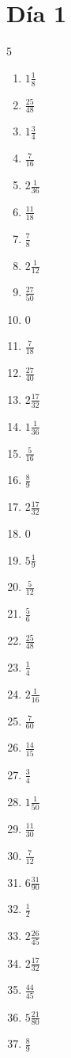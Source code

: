 \documentclass[12pt]{article}
\begin{document}
\section*{Día 1}
\begin{multicols}{5}\begin{enumerate}
\item $ 1 \frac{1}{8} $
\item $ \frac{25}{48} $
\item $ 1 \frac{3}{4} $
\item $ \frac{7}{16} $
\item $ 2 \frac{1}{36} $
\item $ \frac{11}{18} $
\item $ \frac{7}{8} $
\item $ 2 \frac{1}{12} $
\item $ \frac{27}{50} $
\item $ 0 $
\item $ \frac{7}{18} $
\item $ \frac{27}{40} $
\item $ 2 \frac{17}{32} $
\item $ 1 \frac{1}{36} $
\item $ \frac{5}{16} $
\item $ \frac{8}{9} $
\item $ 2 \frac{17}{32} $
\item $ 0 $
\item $ 5 \frac{1}{9} $
\item $ \frac{5}{12} $
\item $ \frac{5}{6} $
\item $ \frac{25}{48} $
\item $ \frac{1}{4} $
\item $ 2 \frac{1}{16} $
\item $ \frac{7}{60} $
\item $ \frac{14}{15} $
\item $ \frac{3}{4} $
\item $ 1 \frac{1}{50} $
\item $ \frac{11}{30} $
\item $ \frac{7}{12} $
\item $ 6 \frac{31}{90} $
\item $ \frac{1}{2} $
\item $ 2 \frac{26}{45} $
\item $ 2 \frac{17}{32} $
\item $ \frac{44}{45} $
\item $ 5 \frac{21}{80} $
\item $ \frac{8}{9} $

\end{enumerate}
\end{multicols}
\end{document}

